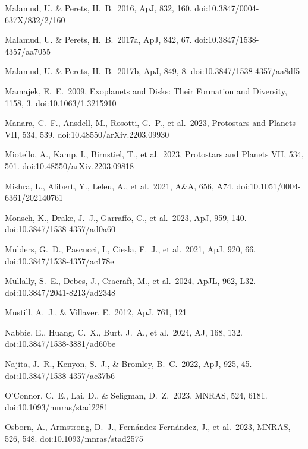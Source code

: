 \documentclass[useAMS,usenatbib]{mn2e}
\begin{document}
\begin{thebibliography}{99}
 Malamud, U. \& Perets, H.~B.\ 2016, ApJ, 832, 160. doi:10.3847/0004-637X/832/2/160

 Malamud, U. \& Perets, H.~B.\ 2017a, ApJ, 842, 67. doi:10.3847/1538-4357/aa7055

 Malamud, U. \& Perets, H.~B.\ 2017b, ApJ, 849, 8. doi:10.3847/1538-4357/aa8df5

 Mamajek, E.~E.\ 2009, Exoplanets and Disks: Their Formation and Diversity, 1158, 3. doi:10.1063/1.3215910

 Manara, C.~F., Ansdell, M., Rosotti, G.~P., et al.\ 2023, Protostars and Planets VII, 534, 539. doi:10.48550/arXiv.2203.09930

 Miotello, A., Kamp, I., Birnstiel, T., et al.\ 2023, Protostars and Planets VII, 534, 501. doi:10.48550/arXiv.2203.09818

 Mishra, L., Alibert, Y., Leleu, A., et al.\ 2021, A\&A, 656, A74. doi:10.1051/0004-6361/202140761

 Monsch, K., Drake, J.~J., Garraffo, C., et al.\ 2023, ApJ, 959, 140. doi:10.3847/1538-4357/ad0a60

 Mulders, G.~D., Pascucci, I., Ciesla, F.~J., et al.\ 2021, ApJ, 920, 66. doi:10.3847/1538-4357/ac178e

 Mullally, S.~E., Debes, J., Cracraft, M., et al.\ 2024, ApJL, 962, L32. doi:10.3847/2041-8213/ad2348

 Mustill, A.~J., \& Villaver, E.\ 2012, ApJ, 761, 121 

 Nabbie, E., Huang, C.~X., Burt, J.~A., et al.\ 2024, AJ, 168, 132. doi:10.3847/1538-3881/ad60be

 Najita, J.~R., Kenyon, S.~J., \& Bromley, B.~C.\ 2022, ApJ, 925, 45. doi:10.3847/1538-4357/ac37b6

 O'Connor, C.~E., Lai, D., \& Seligman, D.~Z.\ 2023, MNRAS, 524, 6181. doi:10.1093/mnras/stad2281

 Osborn, A., Armstrong, D.~J., Fern{\'a}ndez Fern{\'a}ndez, J., et al.\ 2023, MNRAS, 526, 548. doi:10.1093/mnras/stad2575


\end{thebibliography}
\end{document}
